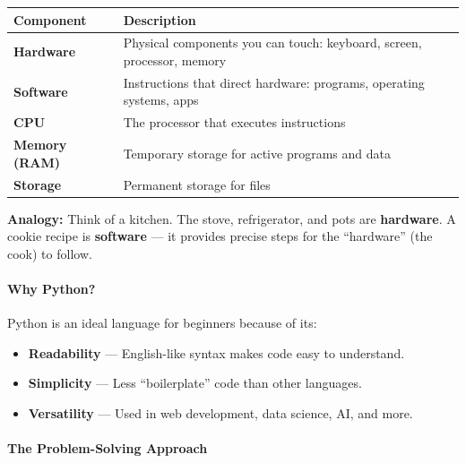 \documentclass[
  justified,
  openright,
]{tufte-book}
\let\subsubsection\paragraph
\let\paragraph\paragraph
\let\subsubsection\paragraph
\let\paragraph\paragraph
\providecommand{\tightlist}{%
  \setlength{\itemsep}{0pt}\setlength{\parskip}{0pt}}
\begin{document}
{\def\LTcaptype{none} %
\begin{longtable}[]{@{}
  >{\raggedright\arraybackslash}p{}
  >{\raggedright\arraybackslash}p{}@{}}
\toprule\noalign{}
\begin{minipage}[b]{\linewidth}\raggedright
Component
\end{minipage} & \begin{minipage}[b]{\linewidth}\raggedright
Description
\end{minipage} \\
\midrule\noalign{}
\endhead
\bottomrule\noalign{}
\endlastfoot
\textbf{Hardware} & Physical components you can touch: keyboard, screen,
processor, memory \\
\textbf{Software} & Instructions that direct hardware: programs,
operating systems, apps \\
\textbf{CPU} & The processor that executes instructions \\
\textbf{Memory (RAM)} & Temporary storage for active programs and
data \\
\textbf{Storage} & Permanent storage for files \\
\end{longtable}
}

\textbf{Analogy:} Think of a kitchen. The stove, refrigerator, and pots
are \textbf{hardware}. A cookie recipe is \textbf{software} --- it
provides precise steps for the ``hardware'' (the cook) to follow.

\subsubsection{Why Python?}\label{why-python}

Python is an ideal language for beginners because of its:

\begin{itemize}
\tightlist
\item
  \textbf{Readability} --- English-like syntax makes code easy to
  understand.
\item
  \textbf{Simplicity} --- Less ``boilerplate'' code than other
  languages.
\item
  \textbf{Versatility} --- Used in web development, data science, AI,
  and more.
\end{itemize}

\subsubsection{The Problem-Solving
Approach}\label{the-problem-solving-approach}
\end{document}
